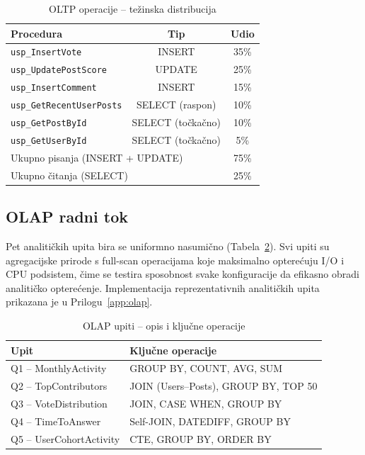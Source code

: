 \begin{table}[htbp]
\centering
\caption{OLTP operacije -- težinska distribucija}
\label{tab:oltp_operacije}
\small
\begin{tabular}{lcc}
\toprule
\textbf{Procedura} & \textbf{Tip} & \textbf{Udio} \\
\midrule
\texttt{usp\_InsertVote} & INSERT & 35\% \\
\texttt{usp\_UpdatePostScore} & UPDATE & 25\% \\
\texttt{usp\_InsertComment} & INSERT & 15\% \\
\texttt{usp\_GetRecentUserPosts} & SELECT (raspon) & 10\% \\
\texttt{usp\_GetPostById} & SELECT (točkačno) & 10\% \\
\texttt{usp\_GetUserById} & SELECT (točkačno) & 5\% \\
\midrule
\multicolumn{2}{l}{Ukupno pisanja (INSERT + UPDATE)} & 75\% \\
\multicolumn{2}{l}{Ukupno čitanja (SELECT)} & 25\% \\
\bottomrule
\end{tabular}
\end{table}


\subsection{OLAP radni tok}

Pet analitičkih upita bira se uniformno nasumično (Tabela~\ref{tab:olap_upiti}). Svi upiti su agregacijske prirode s full-scan operacijama koje maksimalno opterećuju I/O i CPU podsistem, čime se testira sposobnost svake konfiguracije da efikasno obradi analitičko opterećenje. Implementacija reprezentativnih analitičkih upita prikazana je u Prilogu~\ref{app:olap}.

\begin{table}[htbp]
\centering
\caption{OLAP upiti -- opis i ključne operacije}
\label{tab:olap_upiti}
\small
\begin{tabular}{ll}
\toprule
\textbf{Upit} & \textbf{Ključne operacije} \\
\midrule
Q1 -- MonthlyActivity & GROUP BY, COUNT, AVG, SUM \\
Q2 -- TopContributors & JOIN (Users--Posts), GROUP BY, TOP 50 \\
Q3 -- VoteDistribution & JOIN, CASE WHEN, GROUP BY \\
Q4 -- TimeToAnswer & Self-JOIN, DATEDIFF, GROUP BY \\
Q5 -- UserCohortActivity & CTE, GROUP BY, ORDER BY \\
\bottomrule
\end{tabular}
\end{table}

